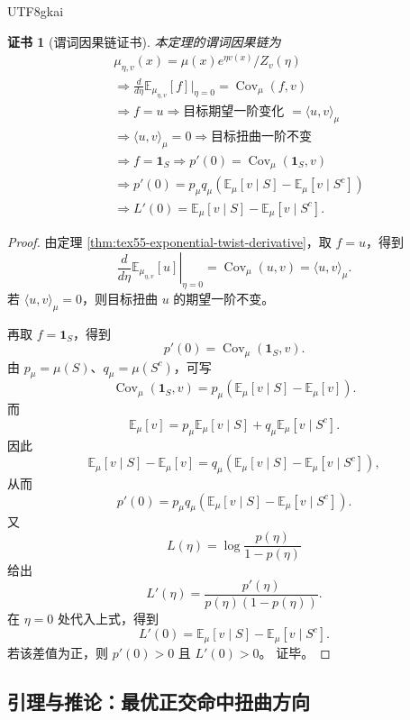 \documentclass[12pt]{article}
\newtheorem{Certificate}{证书}[section]
\begin{document}
\begin{CJK*}{UTF8}{gkai}
\begin{Certificate}[谓词因果链证书]
\label{cert:tex55-orthogonal-first-order-hit}
本定理的谓词因果链为
\[
\begin{aligned}
  &\mu_{\eta,v}(x)=\mu(x)e^{\eta v(x)}/Z_v(\eta)\\
  &\Longrightarrow
  \frac{d}{d\eta}\mathbb E_{\mu_{\eta,v}}[f]\big|_{\eta=0}
  =
  \operatorname{Cov}_\mu(f,v)\\
  &\Longrightarrow
  f=u
  \Longrightarrow
  \text{目标期望一阶变化 }=\langle u,v\rangle_\mu\\
  &\Longrightarrow
  \langle u,v\rangle_\mu=0
  \Longrightarrow
  \text{目标扭曲一阶不变}\\
  &\Longrightarrow
  f=\mathbf 1_S
  \Longrightarrow
  p'(0)=\operatorname{Cov}_\mu(\mathbf 1_S,v)\\
  &\Longrightarrow
  p'(0)=p_\mu q_\mu
  \left(\mathbb E_\mu[v\mid S]-\mathbb E_\mu[v\mid S^c]\right)\\
  &\Longrightarrow
  L'(0)=
  \mathbb E_\mu[v\mid S]-\mathbb E_\mu[v\mid S^c].
\end{aligned}
\]
\end{Certificate}

\begin{proof}
由定理 \ref{thm:tex55-exponential-twist-derivative}，取 \(f=u\)，得到
\[
  \left.
  \frac{d}{d\eta}
  \mathbb E_{\mu_{\eta,v}}[u]
  \right|_{\eta=0}
  =
  \operatorname{Cov}_\mu(u,v)
  =
  \langle u,v\rangle_\mu.
\]
若 \(\langle u,v\rangle_\mu=0\)，则目标扭曲 \(u\) 的期望一阶不变。

再取 \(f=\mathbf 1_S\)，得到
\[
  p'(0)
  =
  \operatorname{Cov}_\mu(\mathbf 1_S,v).
\]
由 \(p_\mu=\mu(S)\)、\(q_\mu=\mu(S^c)\)，可写
\[
  \operatorname{Cov}_\mu(\mathbf 1_S,v)
  =
  p_\mu
  \left(
  \mathbb E_\mu[v\mid S]
  -
  \mathbb E_\mu[v]
  \right).
\]
而
\[
  \mathbb E_\mu[v]
  =
  p_\mu\mathbb E_\mu[v\mid S]
  +
  q_\mu\mathbb E_\mu[v\mid S^c].
\]
因此
\[
  \mathbb E_\mu[v\mid S]-\mathbb E_\mu[v]
  =
  q_\mu
  \left(
  \mathbb E_\mu[v\mid S]
  -
  \mathbb E_\mu[v\mid S^c]
  \right),
\]
从而
\[
  p'(0)
  =
  p_\mu q_\mu
  \left(
  \mathbb E_\mu[v\mid S]
  -
  \mathbb E_\mu[v\mid S^c]
  \right).
\]
又
\[
  L(\eta)=\log\frac{p(\eta)}{1-p(\eta)}
\]
给出
\[
  L'(\eta)
  =
  \frac{p'(\eta)}{p(\eta)(1-p(\eta))}.
\]
在 \(\eta=0\) 处代入上式，得到
\[
  L'(0)
  =
  \mathbb E_\mu[v\mid S]
  -
  \mathbb E_\mu[v\mid S^c].
\]
若该差值为正，则 \(p'(0)>0\) 且 \(L'(0)>0\)。
证毕。
\end{proof}

\subsection{引理与推论：最优正交命中扭曲方向}
\label{subsec:tex55-orthogonal-optimal-direction}


\end{CJK*}
\end{document}
